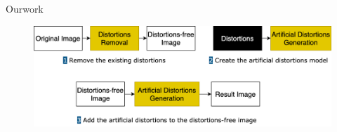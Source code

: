 \documentclass{libs/ufc_format}
\begin{document}
\begin{frame}{Ourwork}



    \begin{figure}
        \includegraphics[scale=0.22]{libs/workoverview.png}
    \end{figure}
\end{frame}
\end{document}
